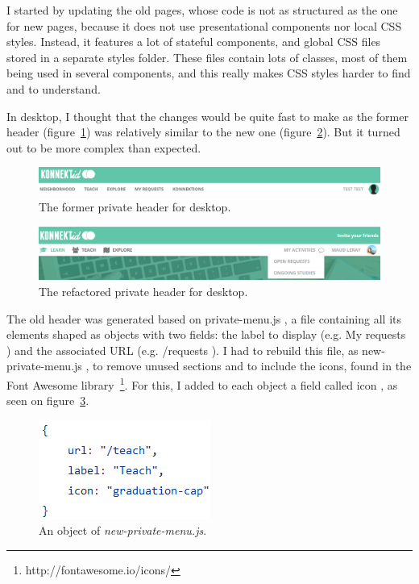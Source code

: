 I started by updating the old pages, whose code is not as structured as the one for new pages, because it does not use presentational components nor local CSS styles. Instead, it features a lot of stateful components, and global CSS files stored in a separate \guillemotleft{} styles \guillemotright{} folder. These files contain lots of classes, most of them being used in several components, and this really makes CSS styles harder to find and to understand.

In desktop, I thought that the changes would be quite fast to make as the former header ({\sc figure}~\ref{fig:oldNavDesktop}) was relatively similar to the new one ({\sc figure}~\ref{fig:newNavDesktop}). But it turned out to be more complex than expected.

\begin{figure}[H]
    \centering
    \includegraphics[scale=0.3]{figure/oldNavDesktop.png}
    \caption{The former private header for desktop.}
    \label{fig:oldNavDesktop}
\end{figure}

\begin{figure}[H]
    \centering
    \includegraphics[scale=0.47]{figure/newNavDesktop.png}
    \caption{The refactored private header for desktop.}
    \label{fig:newNavDesktop}
\end{figure}

The old header was generated based on \guillemotleft{} private-menu.js \guillemotright{}, a file containing all its elements shaped as objects with two fields: the label to display (e.g. \guillemotleft{} My requests \guillemotright{}) and the associated URL (e.g. \guillemotleft{} /requests \guillemotright{}). I had to rebuild this file, as \guillemotleft{} new-private-menu.js \guillemotright{}, to remove unused sections and to include the icons, found in the Font Awesome library~\footnote{http://fontawesome.io/icons/}. For this, I added to each object a field called \guillemotleft{} icon \guillemotright{}, as seen on {\sc figure}~\ref{fig:icon}.

\begin{figure}[H]
    \centering
    \includegraphics[scale=0.9]{figure/icon.png}
    \caption{An object of \textit{new-private-menu.js}.}
    \label{fig:icon}
\end{figure}

